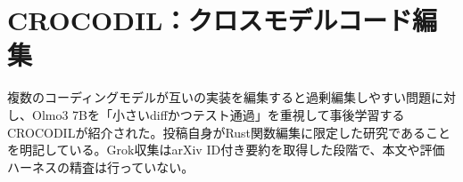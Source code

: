 \section{CROCODIL：クロスモデルコード編集}
複数のコーディングモデルが互いの実装を編集すると過剰編集しやすい問題に対し、Olmo3 7Bを「小さいdiffかつテスト通過」を重視して事後学習するCROCODILが紹介された。投稿自身がRust関数編集に限定した研究であることを明記している。Grok収集はarXiv ID付き要約を取得した段階で、本文や評価ハーネスの精査は行っていない。
